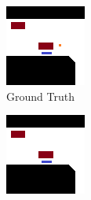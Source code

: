 \begin{figure}[h]
	\centering
	\begin{subfigure}[t]{0.25\linewidth}
		\includegraphics[width=\linewidth]{Figures/Res_Prop/GT_colloquium}
		\caption{Ground Truth}
		\label{fig:met_crit_gt}
	\end{subfigure} \hfil
	\begin{subfigure}[t]{0.25\linewidth}
		\includegraphics[width=\linewidth]{Figures/Res_Prop/local_error_colloquium}

\end{subfigure}
\end{figure}
